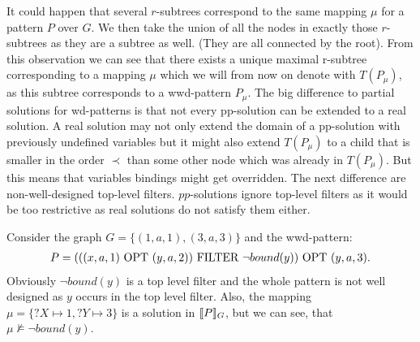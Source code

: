 It could happen that several $r$-subtrees correspond to the same mapping $\mu$
for a pattern $P$ over $G$. We then take the union of all the nodes in exactly
those $r$-subtrees as they are a subtree as well. (They are all connected by the root). 
From this observation we can see that there exists a unique maximal r-subtree
corresponding to a mapping $\mu$ which we will from now on denote with
$T(P_\mu)$, as this subtree corresponds to a wwd-pattern $P_\mu$. The
big difference to partial solutions for wd-patterns is that not every pp-solution can be
extended to a real solution. A real solution may not only extend the domain of a pp-solution
with previously undefined variables but it might also extend $T(P_\mu)$ to a
child that is smaller in the order $\prec$ than some other node which was
already in $T(P_\mu)$. But this means that variables bindings might get
overridden. The next difference are non-well-designed top-level filters.
$pp$-solutions ignore top-level filters as it would be too restrictive as real
solutions do not satisfy them either. 

\begin{example}
	Consider the graph $G = \{(1,a,1), (3,a,3)\}$ and the wwd-pattern:
	\begin{align*}
		P = (((x,a,1) \mbox{ OPT } (y,a,2)) \mbox{ FILTER } \neg bound(y)) \mbox{ OPT } (y,a,3).
	\end{align*}
	Obviously $\neg bound(y)$ is a top level filter and the whole pattern is
	not well designed as $y$ occurs in the top level filter.
	Also, the mapping $\mu = \{?X \mapsto 1, ?Y \mapsto 3\}$ is a solution in
	$\llbracket P \rrbracket_G$, but we can see, that $\mu \not\models \neg bound(y)$.
\end{example}

